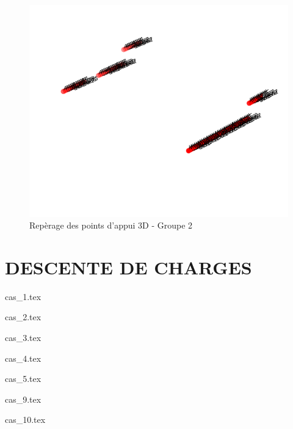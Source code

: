     \begin{figure}[H] %
        \centering %
        \includegraphics[width=\textwidth]{assets/img/reperage_points_appuis_3D_gr_2_cropped.png} %
        \caption{Repèrage des points d'appui 3D - Groupe 2} %
   \end{figure}
    
    \newpage
    \chapter{DESCENTE DE CHARGES}
    

    {cas_1.tex}

    \newpage
    

    {cas_2.tex}

    \newpage
    

    {cas_3.tex}

    \newpage
    

    {cas_4.tex}

    \newpage
    

    {cas_5.tex}

    \newpage
    

    {cas_9.tex}

    \newpage
    

    {cas_10.tex}

    \newpage
    